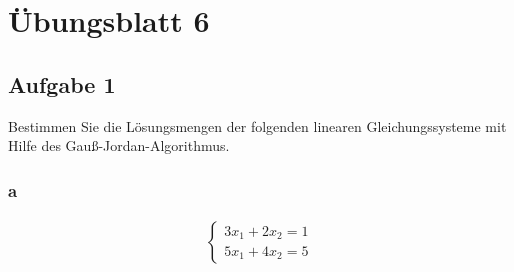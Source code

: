 \chapter{Übungsblatt 6}

\section{Aufgabe 1}
Bestimmen Sie die Lösungsmengen der folgenden linearen Gleichungssysteme mit
Hilfe des Gauß-Jordan-Algorithmus.

\subsection{a}
\begin{align*}
  \begin{cases}
    3x_1 + 2x_2 = 1 \\
    5x_1 + 4x_2 = 5
  \end{cases}
\end{align*}

